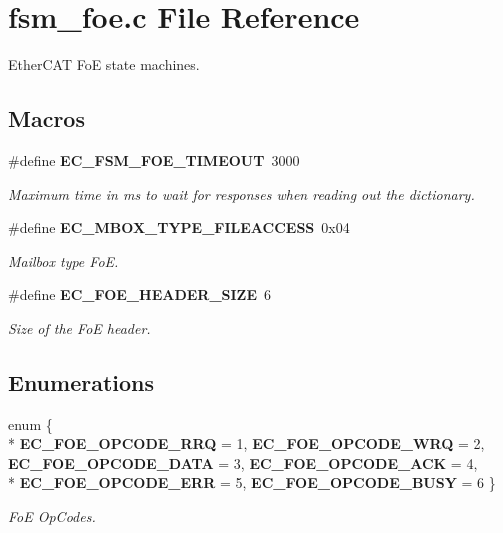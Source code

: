 \section{fsm\-\_\-foe.\-c File Reference}
\label{fsm__foe_8c}


Ether\-C\-A\-T Fo\-E state machines.  


\subsection*{Macros}
\begin{DoxyCompactItemize}
\item 
\#define {\bf E\-C\-\_\-\-F\-S\-M\-\_\-\-F\-O\-E\-\_\-\-T\-I\-M\-E\-O\-U\-T}~3000\label{fsm__foe_8c_a4246c4ce35bd79643952b5a0063a9bc3}

\begin{DoxyCompactList}\small\item\em Maximum time in ms to wait for responses when reading out the dictionary. \end{DoxyCompactList}\item 
\#define {\bf E\-C\-\_\-\-M\-B\-O\-X\-\_\-\-T\-Y\-P\-E\-\_\-\-F\-I\-L\-E\-A\-C\-C\-E\-S\-S}~0x04\label{fsm__foe_8c_a490c6164b77b35a76c142d7ae688ee46}

\begin{DoxyCompactList}\small\item\em Mailbox type Fo\-E. \end{DoxyCompactList}\item 
\#define {\bf E\-C\-\_\-\-F\-O\-E\-\_\-\-H\-E\-A\-D\-E\-R\-\_\-\-S\-I\-Z\-E}~6\label{fsm__foe_8c_a0a2af366a118692e3d53d956a80f9fc3}

\begin{DoxyCompactList}\small\item\em Size of the Fo\-E header. \end{DoxyCompactList}\end{DoxyCompactItemize}
\subsection*{Enumerations}
\begin{DoxyCompactItemize}
\item 
enum \{ \\*
{\bf E\-C\-\_\-\-F\-O\-E\-\_\-\-O\-P\-C\-O\-D\-E\-\_\-\-R\-R\-Q} =  1, 
{\bf E\-C\-\_\-\-F\-O\-E\-\_\-\-O\-P\-C\-O\-D\-E\-\_\-\-W\-R\-Q} =  2, 
{\bf E\-C\-\_\-\-F\-O\-E\-\_\-\-O\-P\-C\-O\-D\-E\-\_\-\-D\-A\-T\-A} =  3, 
{\bf E\-C\-\_\-\-F\-O\-E\-\_\-\-O\-P\-C\-O\-D\-E\-\_\-\-A\-C\-K} =  4, 
\\*
{\bf E\-C\-\_\-\-F\-O\-E\-\_\-\-O\-P\-C\-O\-D\-E\-\_\-\-E\-R\-R} =  5, 
{\bf E\-C\-\_\-\-F\-O\-E\-\_\-\-O\-P\-C\-O\-D\-E\-\_\-\-B\-U\-S\-Y} =  6
 \}
\begin{DoxyCompactList}\small\item\em Fo\-E Op\-Codes. \end{DoxyCompactList}\end{DoxyCompactItemize}
